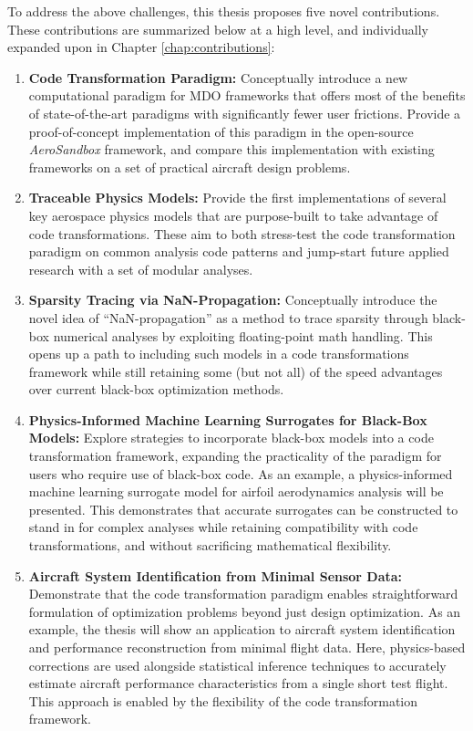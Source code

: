 \documentclass[12pt,vi,oneside,table]{report}
\begin{document}
    To address the above challenges, this thesis proposes five novel contributions. These contributions are summarized below at a high level, and individually expanded upon in Chapter \ref{chap:contributions}:

    \begin{enumerate}
        \item \textbf{Code Transformation Paradigm:} Conceptually introduce a new computational paradigm for MDO frameworks that offers most of the benefits of state-of-the-art paradigms with significantly fewer user frictions. Provide a proof-of-concept implementation of this paradigm in the open-source \textit{AeroSandbox} \cite{sharpe_aerosandbox_2021} framework, and compare this implementation with existing frameworks on a set of practical aircraft design problems.
        \item \textbf{Traceable Physics Models:} Provide the first implementations of several key aerospace physics models that are purpose-built to take advantage of code transformations. These aim to both stress-test the code transformation paradigm on common analysis code patterns and jump-start future applied research with a set of modular analyses.
        \item \textbf{Sparsity Tracing via NaN-Propagation:} Conceptually introduce the novel idea of ``NaN-propagation'' as a method to trace sparsity through black-box numerical analyses by exploiting floating-point math handling. This opens up a path to including such models in a code transformations framework while still retaining some (but not all) of the speed advantages over current black-box optimization methods.
        \item \textbf{Physics-Informed Machine Learning Surrogates for Black-Box Models:} Explore strategies to incorporate black-box models into a code transformation framework, expanding the practicality of the paradigm for users who require use of black-box code. As an example, a physics-informed machine learning surrogate model for airfoil aerodynamics analysis will be presented. This demonstrates that accurate surrogates can be constructed to stand in for complex analyses while retaining compatibility with code transformations, and without sacrificing mathematical flexibility.
        \item \textbf{Aircraft System Identification from Minimal Sensor Data:} Demonstrate that the code transformation paradigm enables straightforward formulation of optimization problems beyond just design optimization. As an example, the thesis will show an application to aircraft system identification and performance reconstruction from minimal flight data. Here, physics-based corrections are used alongside statistical inference techniques to accurately estimate aircraft performance characteristics from a single short test flight. This approach is enabled by the flexibility of the code transformation framework.

\end{enumerate}
\end{document}
